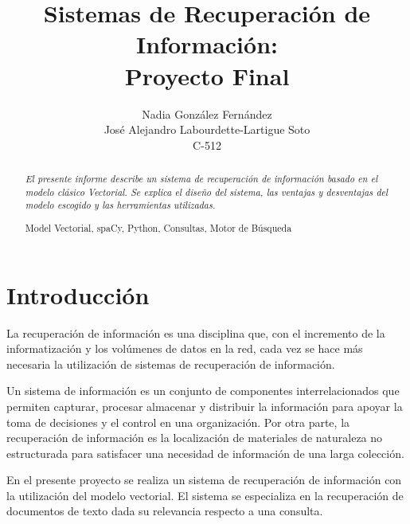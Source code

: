 \documentclass[runningheads,a4paper]{llncs}
\newcommand{\keywords}[1]{\par\addvspace\baselineskip
\noindent\keywordname\enspace\ignorespaces#1}
\begin{document}
\mainmatter  

\title{Sistemas de Recuperación de Información:\\Proyecto Final}



\author{Nadia González Fernández \\ José Alejandro Labourdette-Lartigue Soto\\ C-512}





\maketitle


\begin{abstract}
\emph{El presente informe describe un sistema de recuperación de información basado en el modelo clásico Vectorial. Se explica el diseño del sistema, las ventajas y desventajas del modelo escogido y las herramientas utilizadas.}
\keywords{Model Vectorial, spaCy, Python, Consultas, Motor de Búsqueda}
\end{abstract}


\section{Introducción}\label{sec:introducción}
La recuperación de información es una disciplina que, con el incremento de la informatización y los volúmenes de datos en la red, cada vez se hace más necesaria la utilización de sistemas de recuperación de información.

Un sistema de información es un conjunto de componentes interrelacionados que permiten capturar, procesar almacenar y distribuir la información para apoyar la toma de decisiones y el control en una organización.
Por otra parte, la recuperación de información es la localización de materiales de naturaleza no estructurada para satisfacer una necesidad de información de una larga colección.

En el presente proyecto se realiza un sistema de recuperación de información con la utilización del modelo vectorial.
El sistema se especializa en la recuperación de documentos de texto dada su relevancia respecto a una consulta.
\end{document}
